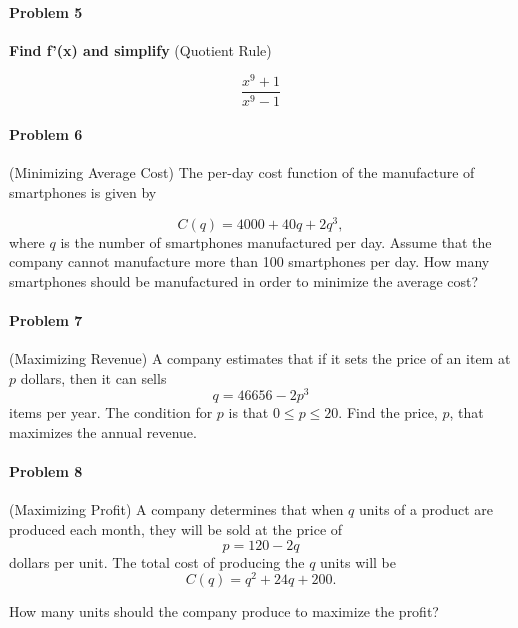 \documentclass[
  letterpaper,
  DIV=11,
  numbers=noendperiod]{scrartcl}
\let\oldparagraph\paragraph
\renewcommand{\paragraph}[1]{\oldparagraph{#1}\mbox{}}
\begin{document}
\paragraph{Problem 5}\label{problem-5}

\textbf{Find f'(x) and simplify} (Quotient Rule)

\[\frac{x^9+1}{x^9-1}\]

\pagebreak

\paragraph{Problem 6}\label{problem-6}

(Minimizing Average Cost) The per-day cost function of the manufacture
of smartphones is given by

\[
C(q) = 4000 +40q + 2q^3,
\] where \(q\) is the number of smartphones manufactured per day. Assume
that the company cannot manufacture more than 100 smartphones per day.
How many smartphones should be manufactured in order to minimize the
average cost?

\hfill\break
\hfill\break
\hfill\break
\hfill\break
\hfill\break
\hfill\break
\hfill\break
\hfill\break
\hfill\break
\hfill\break
\hfill\break
\hfill\break
\hfill\break
\hfill\break
\hfill\break
\hfill\break

\paragraph{Problem 7}\label{problem-7}

(Maximizing Revenue) A company estimates that if it sets the price of an
item at \(p\) dollars, then it can sells \[q = 46656 - 2p^3\] items per
year. The condition for \(p\) is that \(0 \leq p \leq 20\). Find the
price, \(p\), that maximizes the annual revenue.

\pagebreak

\paragraph{Problem 8}\label{problem-8}

(Maximizing Profit) A company determines that when \(q\) units of a
product are produced each month, they will be sold at the price of
\[p = 120-2q\] dollars per unit. The total cost of producing the \(q\)
units will be \[C(q) = q^2 + 24q + 200.\]

How many units should the company produce to maximize the profit?
\end{document}
